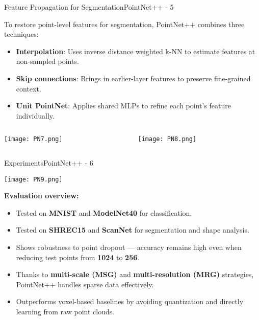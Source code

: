 \documentclass{beamer}
\begin{document}
\begin{frame}{Feature Propagation for Segmentation}{PointNet++ - 5}

\small
To restore point-level features for segmentation, PointNet++ combines three techniques:
\begin{itemize}
    \item \textbf{Interpolation}: Uses inverse distance weighted k-NN to estimate features at non-sampled points.
    \item \textbf{Skip connections}: Brings in earlier-layer features to preserve fine-grained context.
    \item \textbf{Unit PointNet}: Applies shared MLPs to refine each point’s feature individually.
\end{itemize}

\vspace{1.2em}

\begin{columns}[T]
    \begin{column}{0.4\textwidth}
        \centering
        \texttt{[image: PN7.png]}
    \end{column}

    \begin{column}{0.6\textwidth}
        \centering
        \texttt{[image: PN8.png]}
    \end{column}
\end{columns}

\end{frame}


\begin{frame}{Experiments}{PointNet++ - 6}

\begin{center}
    \texttt{[image: PN9.png]}
\end{center}

\vspace{1em}
\small
\textbf{Evaluation overview:}
\begin{itemize}
    \item Tested on \textbf{MNIST} and \textbf{ModelNet40} for classification.
    \item Tested on \textbf{SHREC15} and \textbf{ScanNet} for segmentation and shape analysis.
    \item Shows robustness to point dropout — accuracy remains high even when reducing test points from \textbf{1024} to \textbf{256}.
    \item Thanks to \textbf{multi-scale (MSG)} and \textbf{multi-resolution (MRG)} strategies, PointNet++ handles sparse data effectively.
    \item Outperforms voxel-based baselines by avoiding quantization and directly learning from raw point clouds.
\end{itemize}

\end{frame}
\end{document}
